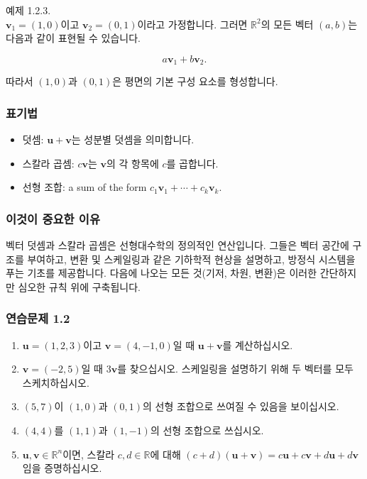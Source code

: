 \documentclass[
  12pt,
  a4paper,
]{article}
\begin{document}
예제 1.2.3.\\
\(\mathbf{v}_1 = (1,0)\)이고 \(\mathbf{v}_2 = (0,1)\)이라고 가정합니다. 그러면 \(\mathbb{R}^2\)의 모든
벡터 \((a,b)\)는 다음과 같이 표현될 수 있습니다.

\[a\mathbf{v}_1 + b\mathbf{v}_2.\]

따라서 \((1,0)\)과 \((0,1)\)은 평면의 기본 구성 요소를 형성합니다.

\subsubsection{표기법}\label{notation-2}

\begin{itemize}
\item
  덧셈: \(\mathbf{u} + \mathbf{v}\)는 성분별 덧셈을 의미합니다.
\item
  스칼라 곱셈: \(c\mathbf{v}\)는 \(\mathbf{v}\)의 각 항목에 \(c\)를 곱합니다.
\item
  선형 조합: a sum of the form
  \(c_1 \mathbf{v}_1 + \cdots + c_k \mathbf{v}_k\).
\end{itemize}

\subsubsection{이것이 중요한 이유}\label{why-this-matters}

벡터 덧셈과 스칼라 곱셈은 선형대수학의 정의적인 연산입니다. 그들은 벡터 공간에 구조를 부여하고, 변환 및 스케일링과 같은 기하학적 현상을 설명하고, 방정식 시스템을 푸는 기초를 제공합니다. 다음에 나오는 모든 것(기저, 차원, 변환)은 이러한 간단하지만
심오한 규칙 위에 구축됩니다.

\subsubsection{연습문제 1.2}\label{exercises-12}

\begin{enumerate}
\def\labelenumi{\arabic{enumi}.}
\item
  \(\mathbf{u} = (1,2,3)\)이고 \(\mathbf{v} = (4, -1, 0)\)일 때 \(\mathbf{u} + \mathbf{v}\)를 계산하십시오.
\item
  \(\mathbf{v} = (-2,5)\)일 때 \(3\mathbf{v}\)를 찾으십시오. 스케일링을 설명하기 위해 두 벡터를 모두 스케치하십시오.
\item
  \((5,7)\)이 \((1,0)\)과 \((0,1)\)의 선형 조합으로 쓰여질 수 있음을 보이십시오.
\item
  \((4,4)\)를 \((1,1)\)과 \((1,-1)\)의 선형 조합으로 쓰십시오.
\item
  \(\mathbf{u}, \mathbf{v} \in \mathbb{R}^n\)이면, 스칼라 \(c,d \in \mathbb{R}\)에 대해 \((c+d)(\mathbf{u}+\mathbf{v}) = c\mathbf{u} + c\mathbf{v} + d\mathbf{u} + d\mathbf{v}\)임을 증명하십시오.
\end{enumerate}
\end{document}
